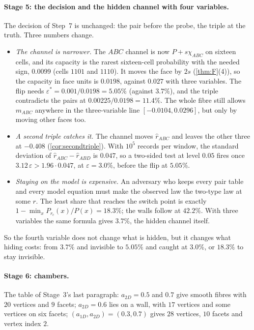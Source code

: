 \documentclass[11pt]{article}
\theoremstyle{definition}\newtheorem{definition}{Definition}\newtheorem{remark}{Remark}
\begin{document}
\paragraph{Stage 5: the decision and the hidden channel with four variables.} The decision of Step~7 is unchanged: the pair before
the probe, the triple at the truth. Three numbers change.
\begin{itemize}
\item \emph{The channel is narrower.} The $ABC$ channel is now $P+s\chi_{ABC}$ on sixteen cells, and its capacity is the rarest
  sixteen-cell probability with the needed sign, $0.0099$ (cells $1101$ and $1110$). It moves the face by $2s$ (\cref{thm:F}(4)), so
  the capacity in face units is $0.0198$, against $0.027$ with three variables. The flip needs $\varepsilon^*=0.001/0.0198=5.05\%$
  (against $3.7\%$), and the triple contradicts the pairs at $0.00225/0.0198=11.4\%$. The whole fibre still allows $m_{ABC}$ anywhere
  in the three-variable line $[-0.0104,0.0296]$, but only by moving other faces too.
\item \emph{A second triple catches it.} The channel moves $\hat r_{ABC}$ and leaves the other three at $-0.408$
  (\cref{cor:secondtriple}). With $10^5$ records per window, the standard deviation of $\hat r_{ABC}-\hat r_{ABD}$ is $0.047$, so a
  two-sided test at level $0.05$ fires once $3.12\,\varepsilon>1.96\cdot0.047$, at $\varepsilon=3.0\%$, before the flip at $5.05\%$.
\item \emph{Staying on the model is expensive.} An adversary who keeps every pair table and every model equation must make the observed
  law the two-type law at some $r$. The least share that reaches the switch point is exactly $1-\min_x P_{r_c}(x)/P(x)=18.3\%$; the walls
  follow at $42.2\%$. With three variables the same formula gives $3.7\%$, the hidden channel itself.
\end{itemize}
So the fourth variable does not change what is hidden, but it changes what hiding costs: from $3.7\%$ and invisible to $5.05\%$ and
caught at $3.0\%$, or $18.3\%$ to stay invisible.

\paragraph{Stage 6: chambers.} The table of Stage~3's last paragraph: $a_{2D}=0.5$ and $0.7$ give smooth fibres with $20$ vertices and
$9$ facets; $a_{2D}=0.6$ lies on a wall, with $17$ vertices and some vertices on six facets; $(a_{1D},a_{2D})=(0.3,0.7)$ gives $28$
vertices, $10$ facets and vertex index $2$.
\end{document}
